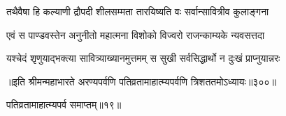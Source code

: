 \begin{center}
\twolineshloka
{तथैवैषा हि कल्याणी द्रौपदी शीलसम्मता}
{तारयिष्यति वः सर्वान्सावित्रीव कुलाङ्गना}




\twolineshloka
{एवं स पाण्डवस्तेन अनुनीतो महात्मना}
{विशोको विज्वरो राजन्काम्यके न्यवसत्तदा}


\twolineshloka
{यश्चेदं शृणुयाद्भक्त्या सावित्र्याख्यानमुत्तमम्}
{स सुखी सर्वसिद्धार्थो न दुःखं प्राप्नुयान्नरः}


॥इति श्रीमन्महाभारते अरण्यपर्वणि
पतिव्रतामाहात्म्यपर्वणि त्रिशततमोऽध्यायः॥३००॥

पतिव्रतामाहात्म्यपर्व समाप्तम्॥१९॥ 

\end{center}